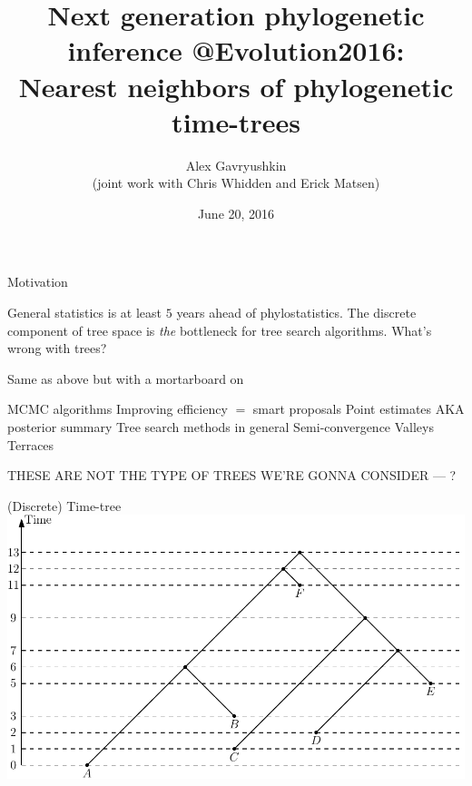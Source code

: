 \documentclass{beamer}
\title[\url{https://gavruskin.github.io/talks/2016_Evolution.pdf}]{Next generation phylogenetic inference @Evolution2016:\\
Nearest neighbors of phylogenetic time-trees}
\author[These slides:]{Alex Gavryushkin\\
(joint work with Chris Whidden and Erick Matsen)}
\date{June 20, 2016}
\newcommand{\MCMC}{$\mathrm{MCMC}$ }
\theoremstyle{example}
\begin{document}
\begin{frame}[plain]
\titlepage
\end{frame}


\addtocounter{framenumber}{-1}


\begin{frame}{Motivation}
\begin{block}

\begin{outline}
\1 General statistics is at least $5$ years ahead of phylostatistics.
\pause
\1 The discrete component of tree space is \emph{the} bottleneck for tree search algorithms.
\pause
\1 What's wrong with trees?
\end{outline}
\end{block}

\pause

\begin{block}{Same as above but with a mortarboard on}
\begin{outline}
\1 \MCMC algorithms
	\2 Improving efficiency $=$ smart proposals
	\2 Point estimates AKA posterior summary
\1 Tree search methods in general
	\2 Semi-convergence
	\2 Valleys
	\2 Terraces
\end{outline}
\end{block}
\end{frame}

\begin{frame}
THESE ARE NOT THE TYPE OF TREES WE'RE GONNA CONSIDER --- ?
\end{frame}

\begin{frame}
\begin{block}{(Discrete) Time-tree}
\includegraphics[width=\framewidth]{discreteTimeTree}
\end{block}
\end{frame}
\end{document}
